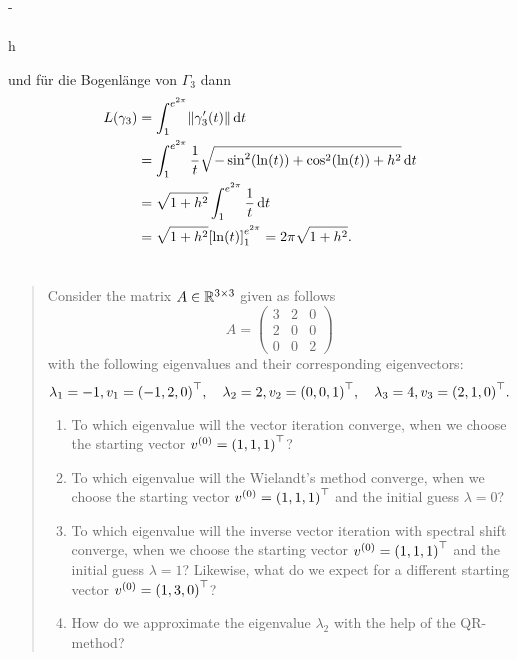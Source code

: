 \documentclass{exercise}
\begin{document}
\begin{enumerate}
\begin{enumerate}
\begin{pmatrix}
				-\sin{}\\
				\cos{}\\
				h
			\end{pmatrix}\) und für die Bogenlänge von \(\Gamma_3\) dann
			\begin{align*}
				L\parentheses*{\gamma_3} &= \int_1^{e^{2\pi}}\norm*{\gamma_3'\parentheses*{t}}\d t\\
				&= \int_1^{e^{2\pi}}\frac{1}{t}\sqrt{-\sin^2\parentheses*{\ln\parentheses*{t}} + \cos^2\parentheses*{\ln\parentheses*{t}} + h^2}\d t\\
				&= \sqrt{1 + h^2}\int_1^{e^{2\pi}}\frac{1}{t}\d t\\
				&= \sqrt{1 + h^2}\brackets*{\ln\parentheses*{t}}_1^{e^{2\pi}} = 2\pi\sqrt{1 + h^2}.
			\end{align*}
		\end{enumerate}
	\end{enumerate}


	\section{}

	\begin{quote}
		Consider the matrix \(A \in \R^{3 \times 3}\) given as follows
		\[
			A = \begin{pmatrix}
				3 & 2 & 0\\
				2 & 0 & 0\\
				0 & 0 & 2
			\end{pmatrix}
		\]
		with the following eigenvalues and their corresponding eigenvectors:
		\[
			\lambda_1 = -1, v_1 = \parentheses*{-1, 2, 0}^\top, \quad \lambda_2 = 2, v_2 = \parentheses*{0, 0, 1}^\top, \quad \lambda_3 = 4, v_3 = \parentheses*{2, 1, 0}^\top.
		\]
		\begin{enumerate}
			\item To which eigenvalue will the vector iteration converge, when we choose the starting vector \(v^{\parentheses*{0}} = \parentheses*{1, 1, 1}^\top\)?
			\item To which eigenvalue will the Wielandt's method converge, when we choose the starting vector \(v^{\parentheses*{0}} = \parentheses*{1, 1, 1}^\top\) and the initial guess \(\lambda = 0\)?
			\item To which eigenvalue will the inverse vector iteration with spectral shift converge, when we choose the starting vector \(v^{\parentheses*{0}} = \parentheses*{1, 1, 1}^\top\) and the initial guess \(\lambda = 1\)?
			Likewise, what do we expect for a different starting vector \(v^{\parentheses*{0}} = \parentheses*{1, 3, 0}^\top\)?
			\item How do we approximate the eigenvalue \(\lambda_2\) with the help of the QR-method?
		\end{enumerate}
	\end{quote}
\end{document}

